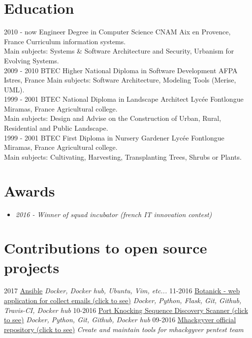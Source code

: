 \documentclass[]{friggeri-cv}
\begin{document}
\section{Education}
\begin{entrylist}
    \entry
        {2010 - now}
        {Engineer Degree in Computer Science}
        {CNAM Aix en Provence, France}
        {Curriculum information systems.\\
        Main subjects: Systems \& Software Architecture and Security, Urbanism for Evolving Systems.\\}
    \entry
        {2009 - 2010}
        {BTEC Higher National Diploma in Software Development}
        {AFPA Istres, France}
        {Main subjects: Software Architecture, Modeling Tools (Merise, UML).\\}
    \entry
        {1999 - 2001}
        {BTEC National Diploma in Landscape Architect}
        {Lycée Fontlongue Miramas, France}
        {Agricultural college.\\
        Main subjects: Design and Advise on the Construction of Urban, Rural, Residential and Public Landscape.\\}
    \entry
        {1999 - 2001}
        {BTEC First Diploma in Nursery Gardener}
        {Lycée Fontlongue Miramas, France}
        {Agricultural college.\\
        Main subjects: Cultivating, Harvesting, Transplanting Trees, Shrubs or Plants.}
\end{entrylist}

\section{Awards}
\begin {itemize}
    \item \emph {2016 - Winner of squad incubator (french IT innovation contest)}
\end {itemize}

\section{Contributions to open source projects}
\begin{entrylist}
  \entry
    {2017}
    {\href{https://github.com/ansible/ansible}{Ansible}}
    { }
    {\emph{Docker, Docker hub, Ubuntu, Vim, etc...}}
  \entry
    {11-2016}
    {\href{https://github.com/4383/Botanick}{Botanick - web application for collect emails (click to see)}}
    { }
    {\emph{Docker, Python, Flask, Git, Github, Travis-CI, Docker hub}}
  \entry
    {10-2016}
    {\href{https://github.com/mhackgyver-squad/porno-king}{Port Knocking Sequence Discovery Scanner (click to see)}}
    { }
    {\emph{Docker, Python, Git, Github, Docker hub}}
  \entry
    {09-2016}
    {\href{https://github.com/mhackgyver-squad/mhackgyver}{Mhackgyver official repository (click to see)}}
    { }
    {\emph{Create and maintain tools for mhackgyver pentest team}}
\end{entrylist}
\end{document}
